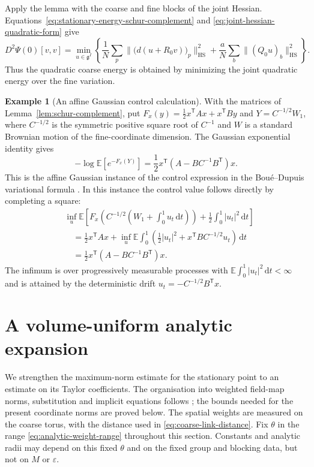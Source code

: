 \documentclass[10pt,reqno]{amsart}
\theoremstyle{definition}
\newtheorem{example}[definition]{Example}
\theoremstyle{remark}
\numberwithin{equation}{section}
\numberwithin{figure}{section}
\newcommand{\g}{\mathfrak g}
\newcommand{\dd}{\mathrm d}
\newcommand{\e}{\varepsilon}
\begin{document}
Apply the lemma with the coarse and fine blocks of the joint Hessian.
Equations~\eqref{eq:stationary-energy-schur-complement} and
\eqref{eq:joint-hessian-quadratic-form} give
\begin{equation}\label{eq:stationary-energy-variational-form}
\boxed{D^2\Psi(0)[v,v]
=\min_{u\in\g^I}\left\{
\frac1N\sum_p\|\bigl(d(u+R_0v)\bigr)_p\|_{\mathrm{HS}}^2
+\frac aN\sum_b\|(Q_0u)_b\|_{\mathrm{HS}}^2\right\}.}
\end{equation}
Thus the quadratic coarse energy is obtained by minimizing the joint
quadratic energy over the fine variation.

\begin{example}[An affine Gaussian control calculation]\label{ex:schur-gaussian-control}
With the matrices of Lemma~\ref{lem:schur-complement}, put
$F_x(y)=\tfrac12x^{\mathsf T}Ax+x^{\mathsf T}By$ and
$Y=C^{-1/2}W_1$, where $C^{-1/2}$ is the symmetric positive square
root of $C^{-1}$ and $W$ is a standard Brownian motion of the
fine-coordinate dimension. The Gaussian exponential identity gives
\begin{equation}\label{eq:schur-gaussian-expectation}
-\log\mathbb E[e^{-F_x(Y)}]
=\frac12x^{\mathsf T}(A-BC^{-1}B^{\mathsf T})x.
\end{equation}
This is the affine Gaussian instance of the control expression in the
Bou\'e--Dupuis variational formula \cite{BoueDupuis98}. In this instance
the control value follows directly by completing a square:
\begin{equation}\label{eq:schur-gaussian-control-value}
\begin{aligned}
&\inf_u\mathbb E\left[
F_x\left(C^{-1/2}\left(W_1+\int_0^1u_t\,\dd t\right)\right)
+\frac12\int_0^1|u_t|^2\,\dd t\right]\\
&\quad=\frac12x^{\mathsf T}Ax+
\inf_u\mathbb E\int_0^1
\left(\frac12|u_t|^2+x^{\mathsf T}BC^{-1/2}u_t\right)\,\dd t\\
&\quad=\frac12x^{\mathsf T}(A-BC^{-1}B^{\mathsf T})x.
\end{aligned}
\end{equation}
The infimum is over progressively measurable processes with
$\mathbb E\int_0^1|u_t|^2\,\dd t<\infty$ and is attained by the
deterministic drift $u_t=-C^{-1/2}B^{\mathsf T}x$.
\end{example}


\section{A volume-uniform analytic expansion}\label{sec:weighted-analytic-energy}
We strengthen the maximum-norm estimate for the stationary point to
an estimate on its Taylor coefficients. The organisation into weighted
field-map norms, substitution and implicit equations follows
\cite[Sections~2--4]{BFKT16}; the bounds needed for the present
coordinate norms are proved below. The spatial weights are
measured on the coarse torus, with the distance used in
\eqref{eq:coarse-link-distance}. Fix $\theta$ in the range
\eqref{eq:analytic-weight-range} throughout this section.
Constants and analytic radii may depend on this fixed $\theta$ and on
the fixed group and blocking data, but not on $M$ or $\e$.
\end{document}
